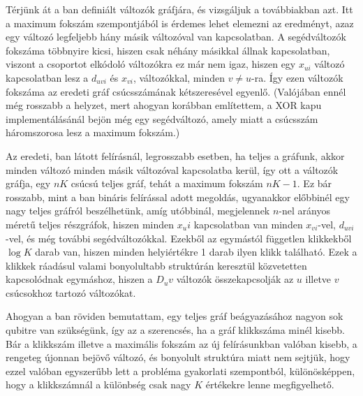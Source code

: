 Térjünk át a ban definiált változók gráfjára, és vizsgáljuk a továbbiakban azt.
Itt a maximum fokszám szempontjából is érdemes lehet elemezni az eredményt, azaz egy változó legfeljebb hány másik változóval van kapcsolatban. A segédváltozók fokszáma többnyire kicsi, hiszen csak néhány másikkal állnak kapcsolatban, viszont a csoportot elkódoló változókra ez már nem igaz, hiszen egy $x_{ui}$ változó kapcsolatban lesz a $d_{uvi}$ és $x_{vi}$,  változókkal, minden $v \neq u$-ra. Így ezen változók fokszáma az eredeti gráf csúcsszámának kétszeresével egyenlő. (Valójában ennél még rosszabb a helyzet, mert ahogyan korábban említettem, a XOR kapu implementálásánál bejön még egy segédváltozó, amely miatt a csúcsszám háromszorosa lesz a maximum fokszám.)

%
%
%
%
%
%
%


 
Az eredeti, ban látott felírásnál, legrosszabb esetben, ha teljes a gráfunk, akkor minden változó minden másik változóval kapcsolatba kerül, így ott a változók gráfja, egy $nK$ csúcsú teljes gráf, tehát a maximum fokszám  $nK -1$. Ez bár rosszabb, mint a ban bináris felírással adott megoldás, ugyanakkor előbbinél egy nagy teljes gráfról beszélhetünk, amíg utóbbinál, megjelennek $n$-nel arányos méretű teljes részgráfok, hiszen minden $x_ui$ kapcsolatban van minden $x_{vi}$-vel, $d_{uvi}$-vel, és még további segédváltozókkal. Ezekből az egymástól független klikkekből $\log K$ darab van, hiszen minden helyiértékre 1 darab ilyen klikk található. Ezek a klikkek ráadásul valami bonyolultabb struktúrán keresztül közvetetten kapcsolódnak egymáshoz, hiszen a $D_uv$ változók összekapcsolják az $u$ illetve $v$ csúcsokhoz tartozó változókat.

Ahogyan a ban röviden bemutattam, egy teljes gráf beágyazásához nagyon sok qubitre van szükségünk, így az a szerencsés, ha a gráf klikkszáma minél kisebb. Bár a klikkszám illetve a maximális fokszám az új felírásunkban valóban kisebb, a rengeteg újonnan bejövő változó, és bonyolult struktúra miatt nem sejtjük, hogy ezzel valóban egyszerűbb lett a probléma gyakorlati szempontból, különösképpen, hogy a klikkszámnál a különbség csak nagy $K$ értékekre lenne megfigyelhető.

